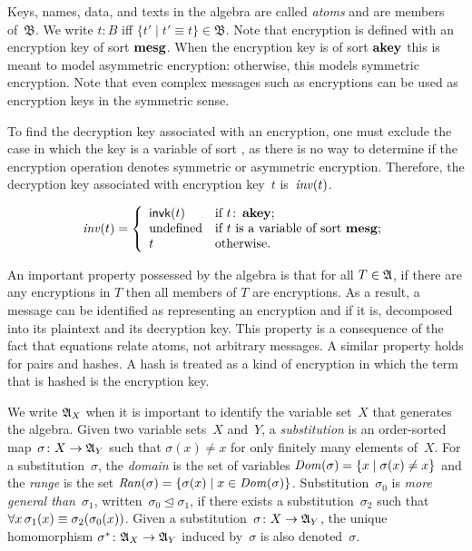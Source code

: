 \documentclass[12pt]{report}
\theoremstyle{definition}
\newcommand{\alga}{\alg{A}}
\newcommand{\base}{\ensuremath{\mathfrak B}}
\newcommand{\sdom}{\fn{Dom}}
\newcommand{\sran}{\fn{Ran}}
\begin{document}
Keys, names, data, and texts in the algebra are called
\emph{atoms} and are members of~$\base$.  We write
$t\colon B$ iff $\{t'\mid t'\equiv t\}\in\base$.  Note that encryption
is defined with an encryption key of sort $\operatorname{\mathbf{mesg}}$.  When the
encryption key is of sort $\operatorname{\mathbf{akey}}$ this is meant to model
asymmetric encryption: otherwise, this models symmetric encryption.
Note that even complex messages such as encryptions can be used as
encryption keys in the symmetric sense.

To find the decryption key associated with an encryption, one must
exclude the case in which the key is a variable of sort ,
as there is no way to determine if the encryption operation denotes
symmetric or asymmetric encryption.  Therefore, the decryption
key associated with encryption key~$t$
is~$\operatorname{\mathit{inv}}(t)$.

$$\fn{inv}(t) =\left\{
\begin{array}{ll}
\cn{invk}(t)&\mbox{if $t\colon\dom{akey}$;}\\
\mbox{undefined}&\mbox{if $t$ is a variable of sort $\dom{mesg}$;}\\
t&\mbox{otherwise.}
\end{array}\right. %
$$

An important property possessed by the algebra is that for all
$T\in\alga$, if there are any encryptions in $T$ then all members of
$T$ are encryptions.  As a result, a message can be identified as
representing an encryption and if it is, decomposed into its plaintext
and its decryption key.  This property is a consequence of the fact
that equations relate atoms, not arbitrary messages.  A similar
property holds for pairs and hashes.  A hash is treated as
a kind of encryption in which the term that is hashed is the
encryption key.

We write $\alga_X$ when it is important to identify the variable
set~$X$ that generates the algebra.  Given two variable sets~$X$
and~$Y$, a \emph{substitution} is an order-sorted
map~$\sigma\colon X\rightarrow\alga_Y$ such that $\sigma(x)\neq x$ for
only finitely many elements of~$X$.  For a substitution~$\sigma$, the
\emph{domain} is the set of variables
$\sdom(\sigma)=\{x\mid \sigma(x)\neq x\}$ and the
\emph{range} is the set $\sran(\sigma)=\{\sigma(x)\mid
x\in\sdom(\sigma)\}$.  Substitution~$\sigma_0$ is \emph{more general than}~$\sigma_1$,
written~$\sigma_0\unlhd\sigma_1$, if there exists a
substitution~$\sigma_2$ such that
$\mathop{\forall x}\sigma_1(x)\equiv\sigma_2(\sigma_0(x))$.  Given a
substitution~$\sigma\colon X\rightarrow\alga_Y$, the unique
homomorphism $\sigma^\ast\colon
\alga_X\rightarrow\alga_Y$ induced by~$\sigma$ is also
denoted~$\sigma$.
\end{document}
